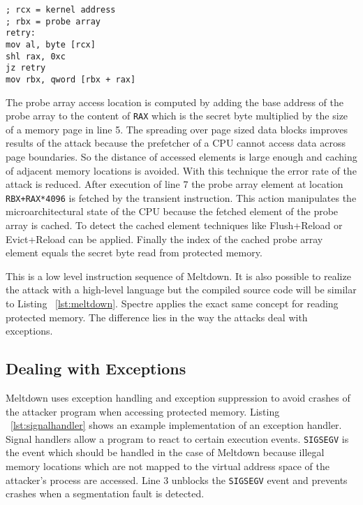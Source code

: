 \documentclass[a4paper,oneside,openright] {scrreprt}
\begin{document}
\begin{lstlisting}[language={[x86masm]Assembler}, caption=Meltdown: Transient Instruction Sequence, label={lst:meltdown}]
; rcx = kernel address
; rbx = probe array
retry:
mov al, byte [rcx]
shl rax, 0xc
jz retry
mov rbx, qword [rbx + rax]
\end{lstlisting}

The probe array access location is computed by adding the base address of the probe array to the content of \texttt{RAX} which 
is the secret byte multiplied by the size of a memory page in line 5.
The spreading over page sized data blocks improves results of the attack because the prefetcher of a CPU
 cannot access data across page boundaries.
So the distance of accessed elements is large enough and caching of adjacent memory locations is avoided.
With this technique the error rate of the attack is reduced. 
After execution of line 7 the probe array element at location \texttt{RBX+RAX*4096} is fetched by the transient instruction.
This action manipulates the microarchitectural state of the CPU because the fetched element of the probe array is cached.
To detect the cached element techniques like Flush+Reload or Evict+Reload can be applied.
Finally the index of the cached probe array element equals the secret byte read from protected memory.

This is a low level instruction sequence of Meltdown. It is also possible to realize the attack with a high-level language
but the compiled source code will be similar to Listing ~\ref{lst:meltdown}.
Spectre applies the exact same concept for reading protected memory. 
The difference lies in the way the attacks deal with exceptions.



\subsection{Dealing with Exceptions}
\label{ch:intro:motivation:A}

Meltdown uses exception handling and exception suppression to avoid crashes of the attacker program when accessing protected memory.
Listing ~\ref{lst:signalhandler} shows an example implementation of an exception handler.
Signal handlers allow a program to react to certain execution events. 
\texttt{SIGSEGV} is the event which should be handled in the case of Meltdown because illegal memory locations 
which are not mapped to the virtual address space of the attacker's process are accessed.
Line 3 unblocks the \texttt{SIGSEGV} event and prevents crashes when a segmentation fault is detected.
\end{document}
